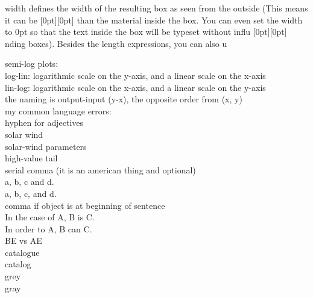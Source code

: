 

width defines the width of the resulting box as seen from the outside (This means it can be \raisebox{0pt}[0pt][0pt]{} than the material inside the box. You can even set the width to 0pt so that the text inside the box will be typeset without influ%
\raisebox{0pt}[0pt][0pt]{%
\raisebox{-0.1ex}{en}%
\raisebox{-0.3ex}{c}%
\raisebox{-0.6ex}{i}%
\raisebox{-1.0ex}{n}%
\raisebox{-1.5ex}{g}%
\raisebox{-2.1ex}{ }%
\raisebox{-2.8ex}{t}%
\raisebox{-3.6ex}{h}%
\raisebox{-4.5ex}{e}%
\raisebox{-2ex}{ }%
\raisebox{2.8ex}{s}%
\raisebox{2.2ex}{u}%
\raisebox{1.8ex}{r}%
\raisebox{1.2ex}{r}%
\raisebox{0.8ex}{o}%
\raisebox{0.3ex}{u}}%
nding boxes). Besides the length expressions, you can also u


semi-log plots:\\
log-lin:	logarithmic scale on the y-axis, and a linear scale on the x-axis\\
lin-log:	logarithmic scale on the x-axis, and a linear scale on the y-axis\\
the naming is output-input (y-x), the opposite order from (x, y)\\


my common language errors:\\
hyphen for adjectives\\
solar wind\\
solar-wind parameters\\
high-value tail\\

serial comma (it is an american thing and optional)\\
a, b, c and d.\\
a, b, c, and d.\\

comma if object is at beginning of sentence\\
In the case of A, B is C.\\
In order to A, B can C.\\

BE vs AE\\
catalogue\\
catalog\\

grey\\
gray\\




